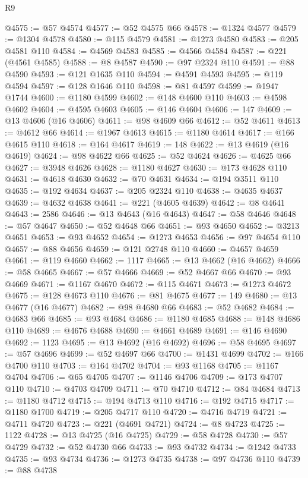 \begin{lexlean}{R9}
\begin{coremodule}
@4575 := @57 @4574
@4577 := @52 @4575 @66
@4578 := @1324 @4577
@4579 := @1304 @4578
@4580 := @115 @4579
@4581 := @1273 @4580
@4583 := @205 @4581 @110
@4584 := @4569 @4583
@4585 := @4566 @4584
@4587 := @221 (@4561 @4585)
@4588 := @8 @4587
@4590 := @97 @2324 @110
@4591 := @88 @4590
@4593 := @121 @1635 @110
@4594 := @4591 @4593
@4595 := @119 @4594
@4597 := @128 @1646 @110
@4598 := @81 @4597
@4599 := @1947 @1744
@4600 := @1180 @4599
@4602 := @148 @4600 @110
@4603 := @4598 @4602
@4604 := @4595 @4603
@4605 := @146 @4604
@4606 := 147
@4609 := @13 @4606 (@16 @4606)
@4611 := @98 @4609 @66
@4612 := @52 @4611
@4613 := @4612 @66
@4614 := @1967 @4613
@4615 := @1180 @4614
@4617 := @166 @4615 @110
@4618 := @164 @4617
@4619 := 148
@4622 := @13 @4619 (@16 @4619)
@4624 := @98 @4622 @66
@4625 := @52 @4624
@4626 := @4625 @66
@4627 := @3948 @4626
@4628 := @1180 @4627
@4630 := @173 @4628 @110
@4631 := @4618 @4630
@4632 := @70 @4631
@4634 := @194 @3511 @110
@4635 := @192 @4634
@4637 := @205 @2324 @110
@4638 := @4635 @4637
@4639 := @4632 @4638
@4641 := @221 (@4605 @4639)
@4642 := @8 @4641
@4643 := 2586
@4646 := @13 @4643 (@16 @4643)
@4647 := @58 @4646
@4648 := @57 @4647
@4650 := @52 @4648 @66
@4651 := @93 @4650
@4652 := @3213 @4651
@4653 := @93 @4652
@4654 := @1273 @4653
@4656 := @97 @4654 @110
@4657 := @88 @4656
@4659 := @121 @2748 @110
@4660 := @4657 @4659
@4661 := @119 @4660
@4662 := 1117
@4665 := @13 @4662 (@16 @4662)
@4666 := @58 @4665
@4667 := @57 @4666
@4669 := @52 @4667 @66
@4670 := @93 @4669
@4671 := @1167 @4670
@4672 := @115 @4671
@4673 := @1273 @4672
@4675 := @128 @4673 @110
@4676 := @81 @4675
@4677 := 149
@4680 := @13 @4677 (@16 @4677)
@4682 := @98 @4680 @66
@4683 := @52 @4682
@4684 := @4683 @66
@4685 := @93 @4684
@4686 := @1180 @4685
@4688 := @148 @4686 @110
@4689 := @4676 @4688
@4690 := @4661 @4689
@4691 := @146 @4690
@4692 := 1123
@4695 := @13 @4692 (@16 @4692)
@4696 := @58 @4695
@4697 := @57 @4696
@4699 := @52 @4697 @66
@4700 := @1431 @4699
@4702 := @166 @4700 @110
@4703 := @164 @4702
@4704 := @93 @1168
@4705 := @1167 @4704
@4706 := @65 @4705
@4707 := @1146 @4706
@4709 := @173 @4707 @110
@4710 := @4703 @4709
@4711 := @70 @4710
@4712 := @84 @4684
@4713 := @1180 @4712
@4715 := @194 @4713 @110
@4716 := @192 @4715
@4717 := @1180 @1700
@4719 := @205 @4717 @110
@4720 := @4716 @4719
@4721 := @4711 @4720
@4723 := @221 (@4691 @4721)
@4724 := @8 @4723
@4725 := 1122
@4728 := @13 @4725 (@16 @4725)
@4729 := @58 @4728
@4730 := @57 @4729
@4732 := @52 @4730 @66
@4733 := @93 @4732
@4734 := @1242 @4733
@4735 := @93 @4734
@4736 := @1273 @4735
@4738 := @97 @4736 @110
@4739 := @88 @4738

\end{coremodule}
\end{lexlean}
